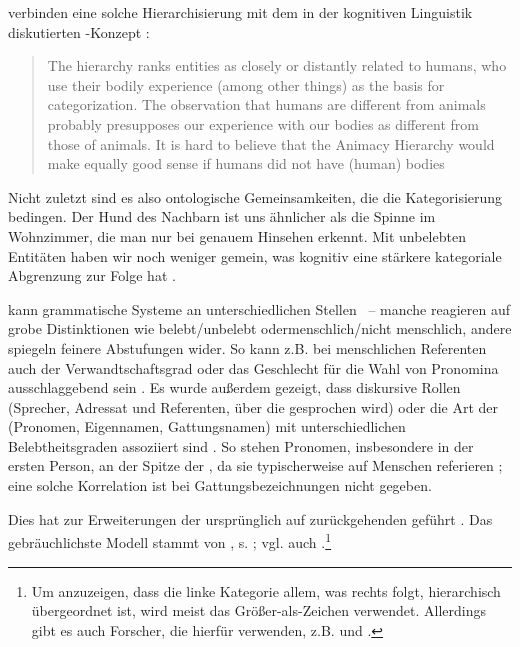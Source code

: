  \noindent
\textcite{Enger2011} verbinden eine solche Hierarchisierung mit dem in der kognitiven Linguistik diskutierten  -Konzept \parencite[vgl.][]{Lakoff1999}:
\blockcquote[208]{Enger2011}[.]{The hierarchy ranks entities as
closely or distantly related to humans, who use their bodily experience (among other things) as the basis for categorization. The observation that humans are different from animals probably presupposes our experience with our bodies as different from those of animals. It is hard to believe that the Animacy Hierarchy would make equally good sense if humans did not have (human) bodies} Nicht zuletzt sind es also ontologische Gemeinsamkeiten, die die Kategorisierung bedingen. Der Hund des Nachbarn ist uns ähnlicher als die Spinne im Wohnzimmer, die man nur bei genauem Hinsehen erkennt.
Mit unbelebten  Entitäten haben wir noch weniger gemein, was kognitiv eine stärkere kategoriale Abgrenzung zur Folge hat  \parencite[vgl. auch][16]{Yamamoto1999}.

 kann grammatische Systeme an unterschiedlichen Stellen ~-- manche reagieren auf grobe Distinktionen wie belebt/unbelebt oder\linebreak menschlich/nicht menschlich, andere spiegeln feinere Abstufungen wider. So kann z.B. bei menschlichen Referenten auch der Verwandtschaftsgrad oder das Geschlecht für die Wahl von Pronomina ausschlaggebend sein \parencite[s. ausführlich][194--197]{Comrie1989, Corbett2000}. Es wurde außerdem gezeigt, dass diskursive Rollen (Sprecher,  Adressat und Referenten, über die gesprochen wird) oder die Art der  (Pronomen, Eigennamen, Gattungsnamen) mit unterschiedlichen Belebtheitsgraden  assoziiert sind \parencite[s. etwa][186]{Comrie1989}. So stehen   Pronomen, insbesondere in der ersten Person, an der Spitze der ,  da sie typischerweise auf Menschen referieren \parencite[s. auch][67]{Fraurud1996}; eine solche Korrelation ist bei Gattungsbezeichnungen  nicht gegeben. 

Dies hat zur Erweiterungen der ursprünglich auf \textcite{Silverstein1976} zurückgehenden   geführt \parencite[vgl. u.a.][]{Allan1987,Langacker1991,Langacker2008,Dixon1995,Corbett2000,Foley2007}. Das gebräuchlichste Modell stammt von \textcite[85]{Dixon1995}, s. ; vgl. auch \textcite[130]{Croft2006}.\footnote{Um anzuzeigen, dass die linke Kategorie allem, was rechts folgt, hierarchisch übergeordnet ist, wird meist das Größer-als-Zeichen \hervor{>} verwendet. Allerdings gibt es auch Forscher, die hierfür \hervor{<} verwenden, z.B. \textcite{Allan1987} und \textcite{Croft2006}.}  


